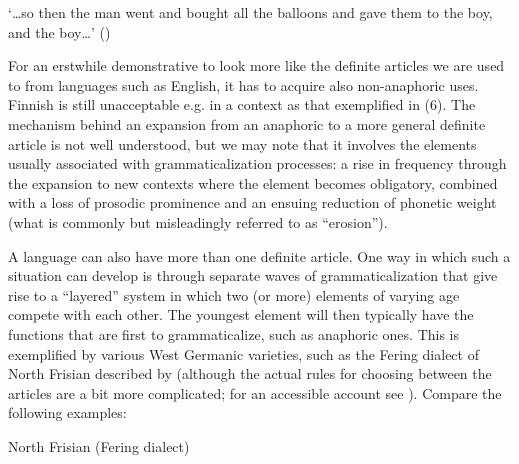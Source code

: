 \glt ‘…so then the man went and bought all the balloons and gave them to the boy, and the boy…’ (\citet[136]{Juvonen2000})

\z

For an erstwhile demonstrative to look more like the definite articles we are used to from languages such as English, it has to acquire also non-anaphoric uses. Finnish is still unacceptable e.g. in a context as that exemplified in (6). The mechanism behind an expansion from an anaphoric to a more general definite article is not well understood, but we may note that it involves the elements usually associated with grammaticalization processes: a rise in frequency through the expansion to new contexts where the element becomes obligatory, combined with a loss of prosodic prominence and an ensuing reduction of phonetic weight (what is commonly but misleadingly referred to as “erosion”). 


A language can also have more than one definite article. One way in which such a situation can develop is through separate waves of grammaticalization that give rise to a “layered” system in which two (or more) elements of varying age compete with each other. The youngest element will then typically have the functions that are first to grammaticalize, such as anaphoric ones. This is exemplified by various West Germanic varieties, such as the Fering dialect of North Frisian described by \citet{Ebert1971} (although the actual rules for choosing between the articles are a bit more complicated; for an accessible account see \citet[162]{Lyons1999}). Compare the following examples:


\item 

North Frisian (Fering dialect)



\item 

